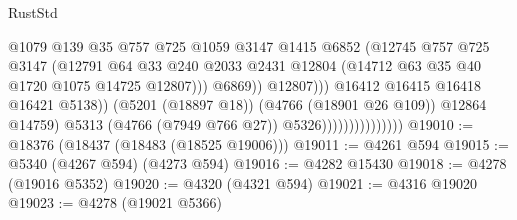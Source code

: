\begin{lexlean}{RustStd}
\begin{coremodule}
                                                  @1079
                                                  @139
                                                  @35
                                                  @757
                                                  @725
                                                  @1059
                                                  @3147
                                                  @1415
                                                  @6852
                                                  (@12745
                                                    @757
                                                    @725
                                                    @3147
                                                    (@12791
                                                      @64
                                                      @33
                                                      @240
                                                      @2033
                                                      @2431
                                                      @12804
                                                      (@14712
                                                        @63
                                                        @35
                                                        @40
                                                        @1720
                                                        @1075
                                                        @14725
                                                        @12807)))
                                                  @6869))
                                              @12807)))
                                        @16412
                                        @16415
                                        @16418
                                        @16421
                                        @5138))
                                    (@5201 (@18897 @18))
                                    (@4766 (@18901 @26 @109))
                                    @12864
                                    @14759)
                                  @5313
                                  (@4766 (@7949 @766 @27))
                                  @5326)))))))))))))))
@19010 := @18376 (@18437 (@18483 (@18525 @19006)))
@19011 := @4261 @594
@19015 := @5340 (@4267 @594) (@4273 @594)
@19016 := @4282 @15430
@19018 := @4278 (@19016 @5352)
@19020 := @4320 (@4321 @594)
@19021 := @4316 @19020
@19023 := @4278 (@19021 @5366)

\end{coremodule}
\end{lexlean}
